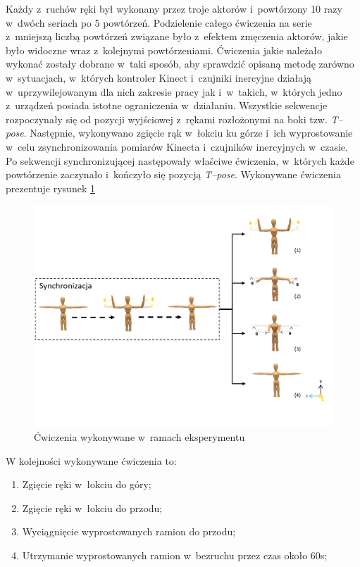Każdy z~ruchów ręki był wykonany przez troje aktorów i~powtórzony 10 razy w~dwóch seriach po 5 powtórzeń. Podzielenie całego ćwiczenia na serie z~mniejszą liczbą powtórzeń związane było z~efektem zmęczenia aktorów, jakie było widoczne wraz z~kolejnymi powtórzeniami. Ćwiczenia jakie należało wykonać zostały dobrane w~taki sposób, aby sprawdzić opisaną metodę zarówno w~sytuacjach, w~których kontroler Kinect i~czujniki inercyjne działają w~uprzywilejowanym dla nich zakresie pracy jak i~w~takich, w~których jedno z~urządzeń posiada istotne ograniczenia w~działaniu. Wszystkie sekwencje rozpoczynały się od pozycji wyjściowej z~rękami rozłożonymi na boki tzw. \emph{T--pose}. Następnie, wykonywano zgięcie rąk w~łokciu ku górze i~ich wyprostowanie w~celu zsynchronizowania pomiarów Kinecta i~czujników inercyjnych w~czasie. Po sekwencji synchronizującej następowały właściwe ćwiczenia, w~których każde powtórzenie zaczynało i~kończyło się pozycją \emph{T--pose}. Wykonywane ćwiczenia prezentuje rysunek \ref{fig:experiments:poses}

\begin{figure}[!htp]
	\centering
	\includegraphics[width=\textwidth]{images/poses.png}
	\caption{Ćwiczenia wykonywane w~ramach eksperymentu}
	\label{fig:experiments:poses}
\end{figure}

W kolejności wykonywane ćwiczenia to:
\begin{enumerate}
	\item Zgięcie ręki w~łokciu do góry; \\
	\item Zgięcie ręki w~łokciu do przodu; \\
	\item Wyciągnięcie wyprostowanych ramion do przodu; \\
	\item Utrzymanie wyprostowanych ramion w~bezruchu przez czas około 60s; \\
\end{enumerate}

